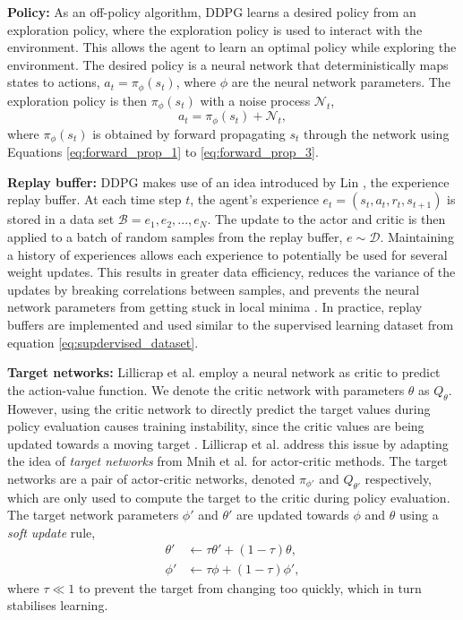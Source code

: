 \textbf{Policy:}
As an off-policy algorithm, DDPG learns a desired policy from an exploration policy, where the exploration policy is used to interact with the environment.
This allows the agent to learn an optimal policy while exploring the environment.
The desired policy is a neural network that deterministically maps states to actions, $a_t = \pi_{\phi}(s_t)$, where $\phi$ are the neural network parameters. 
The exploration policy is then $\pi_{\phi}(s_t)$ with a noise process $\mathcal{N}_t$, 
\begin{equation}\label{eq:dpg_policy}
    a_t = \pi_{\phi}(s_t) + \mathcal{N}_t,
\end{equation}
where $\pi_{\phi}(s_t)$ is obtained by forward propagating $s_t$ through the network using Equations \ref{eq:forward_prop_1} to \ref{eq:forward_prop_3}.

\textbf{Replay buffer:}
DDPG makes use of an idea introduced by Lin \cite{lin1993}, the experience replay buffer. 
At each time step $t$, the agent's experience $e_t = (s_t,a_t,r_t,s_{t+1})$ is stored in a data set $\mathcal{B} = e_1, e_2, ... , e_N$. 
The update to the actor and critic is then applied to a batch of random samples from the replay buffer, $e \sim \mathcal{D}$. 
Maintaining a history of experiences allows each experience to potentially be used for several weight updates.
This results in greater data efficiency, reduces the variance of the updates by breaking correlations between samples, and prevents the neural network parameters from getting stuck in local minima \cite{mnih2013}.
In practice, replay buffers are implemented and used similar to the supervised learning dataset from equation \ref{eq:supdervised_dataset}.

\textbf{Target networks:}
Lillicrap et al. \cite{Lillicrap2016} employ a neural network as critic to predict the action-value function.
We denote the critic network with parameters $\theta$ as $Q_{\theta}$.
However, using the critic network to directly predict the target values during policy evaluation causes training instability, since the critic values are being updated towards a moving target \cite{mnih2013}.
Lillicrap et al. \cite{Lillicrap2016} address this issue by adapting the idea of \emph{target networks} from Mnih et al. \cite{mnih2013} for actor-critic methods.
The target networks are a pair of actor-critic networks, denoted $\pi_{\phi'}$ and $Q_{\theta'}$ respectively, which are only used to compute the target to the critic during policy evaluation.
The target network parameters $\phi'$ and $\theta'$ are updated towards $\phi$ and $\theta$ using a \emph{soft update} rule, 
\begin{equation}
\begin{split}
    \theta' &\leftarrow \tau \theta' + (1 - \tau) \theta, \\
    \phi' &\leftarrow \tau \phi + (1 - \tau) \phi',
\end{split}
\end{equation}
where $\tau \ll 1$ to prevent the target from changing too quickly, which in turn stabilises learning. 


